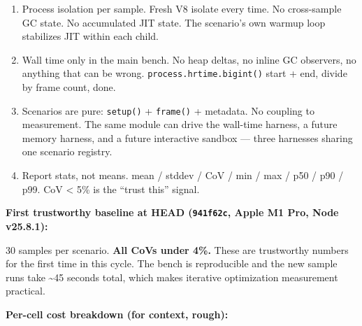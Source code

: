 \begin{enumerate}
\def\labelenumi{\arabic{enumi}.}
\tightlist
\item
  Process isolation per sample. Fresh V8 isolate every time. No cross-sample GC state. No accumulated JIT state. The scenario's own warmup loop stabilizes JIT within each child.
\item
  Wall time only in the main bench. No heap deltas, no inline GC observers, no anything that can be wrong. \texttt{p\allowbreak{}r\allowbreak{}o\allowbreak{}c\allowbreak{}e\allowbreak{}s\allowbreak{}s\allowbreak{}.\allowbreak{}h\allowbreak{}r\allowbreak{}t\allowbreak{}i\allowbreak{}m\allowbreak{}e\allowbreak{}.\allowbreak{}b\allowbreak{}i\allowbreak{}g\allowbreak{}i\allowbreak{}n\allowbreak{}t\allowbreak{}(\allowbreak{})} start + end, divide by frame count, done.
\item
  Scenarios are pure: \texttt{s\allowbreak{}e\allowbreak{}t\allowbreak{}u\allowbreak{}p\allowbreak{}(\allowbreak{})} + \texttt{f\allowbreak{}r\allowbreak{}a\allowbreak{}m\allowbreak{}e\allowbreak{}(\allowbreak{})} + metadata. No coupling to measurement. The same module can drive the wall-time harness, a future memory harness, and a future interactive sandbox --- three harnesses sharing one scenario registry.
\item
  Report stats, not means. mean / stddev / CoV / min / max / p50 / p90 / p99. CoV \textless{} 5\% is the ``trust this'' signal.
\end{enumerate}

\textbf{First trustworthy baseline at HEAD (\texttt{9\allowbreak{}4\allowbreak{}1\allowbreak{}f\allowbreak{}6\allowbreak{}2\allowbreak{}c}, Apple M1 Pro, Node v25.8.1):}



30 samples per scenario. \textbf{All CoVs under 4\%.} These are trustworthy numbers for the first time in this cycle. The bench is reproducible and the new sample runs take \textasciitilde45 seconds total, which makes iterative optimization measurement practical.

\textbf{Per-cell cost breakdown (for context, rough):}

